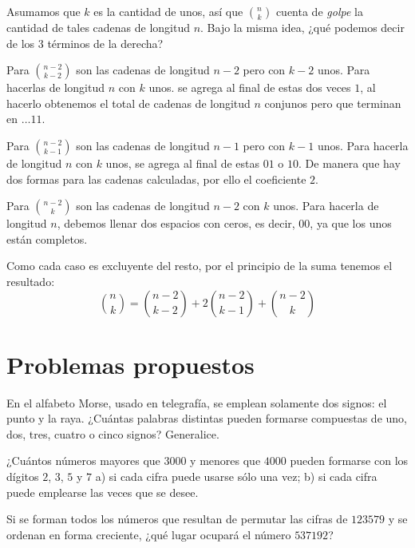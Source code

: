\begin{solucion}
    Asumamos que $k$ es la cantidad de unos, así que $\binom{n}{k}$ cuenta de \textit{golpe} la cantidad de tales cadenas de longitud $n$. Bajo la misma idea, ¿qué podemos decir de los 3 términos de la derecha?

    Para $\displaystyle \binom{n-2}{k-2}$ son las cadenas de longitud $n-2$ pero con $k-2$ unos. Para hacerlas de longitud $n$ con $k$ unos. se agrega al final de estas dos veces $1$, al hacerlo obtenemos el total de cadenas de longitud $n$ conjunos pero que terminan en $\ldots 11$.

    Para $\displaystyle \binom{n-2}{k-1}$ son las cadenas de longitud $n-1$ pero con $k-1$ unos. Para hacerla de longitud $n$ con $k$ unos, se agrega al final de estas $01$ o $10$. De manera que hay dos formas para las cadenas calculadas, por ello el coeficiente $2$.

    Para $\binom{n-2}{k}$ son las cadenas de longitud $n-2$ con $k$ unos. Para hacerla de longitud $n$, debemos llenar dos espacios con ceros, es decir, 00, ya que los unos están completos.

    Como cada caso es excluyente del resto, por el principio de la suma tenemos el resultado:
\[\binom{n}{k}=\binom{n-2}{k-2}+2\binom{n-2}{k-1}+\binom{n-2}{k}\]
\end{solucion}

\section{Problemas propuestos}
\begin{problema}
En el alfabeto Morse, usado en telegrafía, se emplean solamente dos signos: el punto y la raya. ¿Cuántas palabras distintas pueden formarse compuestas de uno, dos, tres, cuatro o cinco signos? Generalice.
\end{problema}

\begin{problema}
¿Cuántos números mayores que $3000$ y menores que $4000$ pueden formarse con los dígitos $2$, $3$, $5$ y $7$ a) si cada cifra puede usarse sólo una vez;
b) si cada cifra puede emplearse las veces que se desee.
\end{problema}

\begin{problema}
Si se forman todos los números que resultan de permutar las cifras de $123579$ y se ordenan en forma creciente, ¿qué lugar ocupará el número $537192$?
\end{problema}

